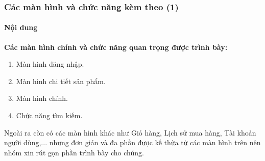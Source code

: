 \documentclass{beamer}
\begin{document}
\begin{frame}
    \frametitle{Các màn hình và chức năng kèm theo (1)}
    \framesubtitle{Nội dung}
    \begin{flushleft}
        \large{\textbf{Các màn hình chính và chức năng quan trọng được trình bày:}}
        \begin{enumerate}
            \item Màn hình đăng nhập.
            \item Màn hình chi tiết sản phẩm.
            \item Màn hình chính.
            \item Chức năng tìm kiếm.
        \end{enumerate}
    \end{flushleft}

    \begin{flushleft}
        Ngoài ra còn có các màn hình khác như \textsf{\color{teal} Giỏ hàng, Lịch sử mua hàng, Tài khoản người dùng,...} nhưng đơn giản và đa phần được kế thừa từ các màn hình trên nên nhóm xin rút gọn phần trình bày cho chúng.
    \end{flushleft}
\end{frame}
\end{document}
